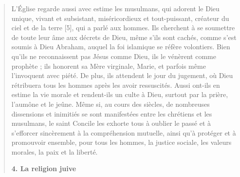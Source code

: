 \begin{quote}
L’Église regarde aussi avec estime les musulmans, qui adorent le Dieu unique, vivant et subsistant, miséricordieux et tout-puissant, créateur du ciel et de la terre [5], qui a parlé aux hommes. Ils cherchent à se soumettre de toute leur âme aux décrets de Dieu, même s’ils sont cachés, comme s’est soumis à Dieu Abraham, auquel la foi islamique se réfère volontiers. Bien qu’ils ne reconnaissent pas Jésus comme Dieu, ils le vénèrent comme prophète ; ils honorent sa Mère virginale, Marie, et parfois même l’invoquent avec piété. De plus, ils attendent le jour du jugement, où Dieu rétribuera tous les hommes après les avoir ressuscités. Aussi ont-ils en estime la vie morale et rendent-ils un culte à Dieu, surtout par la prière, l’aumône et le jeûne.
Même si, au cours des siècles, de nombreuses dissensions et inimitiés se sont manifestées entre les chrétiens et les musulmans, le saint Concile les exhorte tous à oublier le passé et à s’efforcer sincèrement à la compréhension mutuelle, ainsi qu’à protéger et à promouvoir ensemble, pour tous les hommes, la justice sociale, les valeurs morales, la paix et la liberté.

\textbf{4. La religion juive}



\end{quote}
